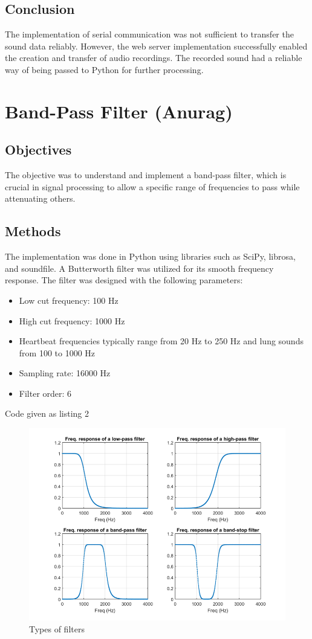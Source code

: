 \documentclass[conference]{IEEEtran}
\begin{document}
\subsection{Conclusion}
The implementation of serial communication was not sufficient to transfer the sound data reliably. However, the web server implementation successfully enabled the creation and transfer of audio recordings. The recorded sound had a reliable way of being passed to Python for further processing.







\section{Band-Pass Filter (Anurag)}
\subsection{Objectives}
The objective was to understand and implement a band-pass filter, which is crucial in signal processing to allow a specific range of frequencies to pass while attenuating others.

\subsection{Methods}
The implementation was done in Python using libraries such as SciPy, librosa, and soundfile. A Butterworth filter was utilized for its smooth frequency response. The filter was designed with the following parameters:
\begin{itemize}
    \item Low cut frequency: 100 Hz
    \item High cut frequency: 1000 Hz
    \item Heartbeat frequencies typically range from 20 Hz to 250 Hz and lung sounds from 100 to 1000 Hz
    \item Sampling rate: 16000 Hz
    \item Filter order: 6
\end{itemize}

Code given as listing 2

\begin{figure}[h]
    \centering
    \includegraphics[width=0.75\linewidth]{Images/bandpass.png}
    \caption{Types of filters}
    \label{fig:Types of filters}
\end{figure}
\end{document}
